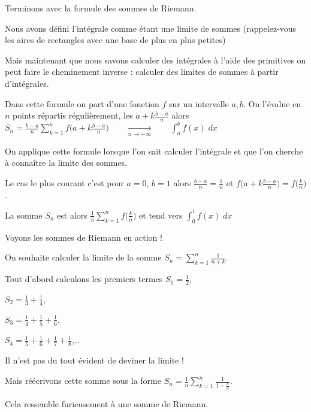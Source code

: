 \diapo

Terminons avec la formule des sommes de Riemann.

Nous avons défini l'intégrale comme étant une limite de sommes (rappelez-vous les aires de rectangles 
avec une base de plus en plus petites)


Mais maintenant que nous savons calculer des intégrales à l'aide des primitives 
on peut faire le cheminement inverse : calculer des limites de sommes à partir d'intégrales.

Dans cette formule on part d'une fonction $f$ sur un intervalle $a,b$.
On l'évalue en $n$ points répartis régulièrement, les $a+k\tfrac{b-a}{n}$
alors $S_n = \tfrac{b-a}{n} \sum_{k=1}^{n} f\big(a+k\tfrac{b-a}{n} \big) 
\qquad \xrightarrow[n\to+\infty]{} \qquad \int_a^b f(x) \; dx$

On applique cette formule lorsque l'on sait calculer l'intégrale et que l'on cherche à connaître la limite des sommes.


\change

Le cas le plus courant c'est pour $a=0$, $b=1$ alors $\frac{b-a}{n}=\frac1n$ et 
$f\big(a+k\frac{b-a}{n}\big) = f\big(\frac kn\big)$.


La somme $S_n$ est alors $\tfrac{1}{n} \sum_{k=1}^{n} f\big(\tfrac kn \big)$
et tend vers $\int_0^1 f(x) \; dx$



\diapo

Voyons les sommes de Riemann en action  !

On souhaite calculer la limite de la somme $S_n= \sum_{k=1}^{n} \frac1{n+k}$.


\change

Tout d'abord calculons les premiers termes  $S_1=\frac12$, 

$S_2=\frac13+\frac14$,

\change

$S_3=\frac14+\frac15+\frac16$,

\change
 
$S_4=\frac15+\frac16+\frac17+\frac18$,\ldots

Il n'est pas du tout évident de deviner la limite !

\change

Mais réécrivons cette somme sous la forme  $S_n = \frac{1}{n}  \sum_{k=1}^{n} \frac1{1+\frac kn}$.

Cela ressemble furieusement à une somme de Riemann.

